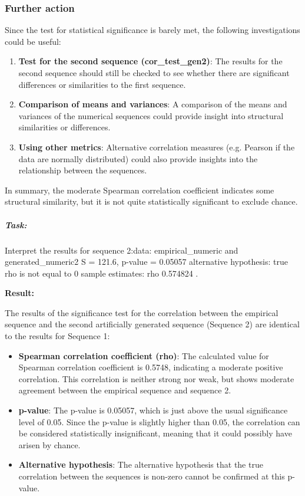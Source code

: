 \documentclass[
]{article}
\begin{document}
\subsubsection{\texorpdfstring{\textbf{Further
action}}{Further action}}\label{further-action}

Since the test for statistical significance is barely met, the following
investigations could be useful:

\begin{enumerate}
\def\labelenumi{\arabic{enumi}.}
\item
  \textbf{Test for the second sequence (cor\_test\_gen2)}: The results
  for the second sequence should still be checked to see whether there
  are significant differences or similarities to the first sequence.
\item
  \textbf{Comparison of means and variances}: A comparison of the means
  and variances of the numerical sequences could provide insight into
  structural similarities or differences.
\item
  \textbf{Using other metrics}: Alternative correlation measures (e.g.
  Pearson if the data are normally distributed) could also provide
  insights into the relationship between the sequences.
\end{enumerate}

In summary, the moderate Spearman correlation coefficient indicates some
structural similarity, but it is not quite statistically significant to
exclude chance.

\subparagraph{\texorpdfstring{ \textbf{Task:}}{ Task:}}\label{task-5}

Interpret the results for sequence 2:\textquotesingle data:
empirical\_numeric and generated\_numeric2 S = 121.6, p-value = 0.05057
alternative hypothesis: true rho is not equal to 0 sample estimates: rho
0.574824 \textquotesingle.

\textbf{Result:}

The results of the significance test for the correlation between the
empirical sequence and the second artificially generated sequence
(Sequence 2) are identical to the results for Sequence 1:

\begin{itemize}
\item
  \textbf{Spearman correlation coefficient (rho)}: The calculated value
  for Spearman correlation coefficient is 0.5748, indicating a moderate
  positive correlation. This correlation is neither strong nor weak, but
  shows moderate agreement between the empirical sequence and sequence
  2.
\item
  \textbf{p-value}: The p-value is 0.05057, which is just above the
  usual significance level of 0.05. Since the p-value is slightly higher
  than 0.05, the correlation can be considered statistically
  insignificant, meaning that it could possibly have arisen by chance.
\item
  \textbf{Alternative hypothesis}: The alternative hypothesis that the
  true correlation between the sequences is non-zero cannot be confirmed
  at this p-value.
\end{itemize}
\end{document}
